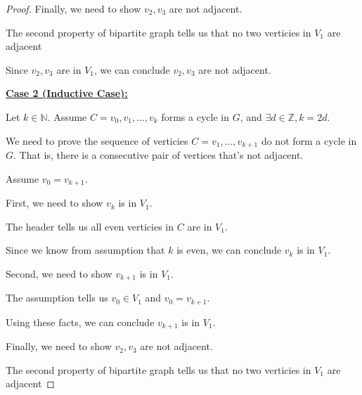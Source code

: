 \documentclass[12pt]{article}
\begin{document}
\begin{enumerate}[a.]
\begin{proof}
        \bigskip

        Finally, we need to show $v_2, v_3$ are not adjacent.

        \bigskip

        The second property of bipartite graph tells us that no two
        verticies in $V_1$ are adjacent

        \bigskip

        Since $v_2,v_3$ are in $V_1$, we can conclude $v_2,v_3$ are not
        adjacent.

        \bigskip

        \underline{\textbf{Case 2 (Inductive Case):}}

        \bigskip

        Let $k \in \mathbb{N}$. Assume $C=v_0,v_1,\dots,v_k$ forms a cycle
        in $G$, and $\exists d \in \mathbb{Z}, k = 2d$.

        \bigskip

        We need to prove the sequence of verticies $C = v_1,\dots,v_{k+1}$
        do not form a cycle in $G$. That is, there is a consecutive pair of
        vertices that's not adjacent.

        \bigskip

        Assume $v_0 = v_{k+1}$.

        \bigskip

        First, we need to show $v_k$ is in $V_1$.

        \bigskip

        The header tells us all even verticies in $C$ are in $V_1$.

        \bigskip

        Since we know from assumption that $k$ is even, we can conclude
        $v_k$ is in $V_1$.

        \bigskip

        Second, we need to show $v_{k+1}$ is in $V_1$.

        \bigskip

        The assumption tells us $v_0 \in V_1$ and $v_0 = v_{k+1}$.

        \bigskip

        Using these facts, we can conclude $v_{k+1}$ is in $V_1$.

        \bigskip

        Finally, we need to show $v_2, v_3$ are not adjacent.

        \bigskip

        The second property of bipartite graph tells us that no two
        verticies in $V_1$ are adjacent


\end{proof}
\end{enumerate}
\end{document}
